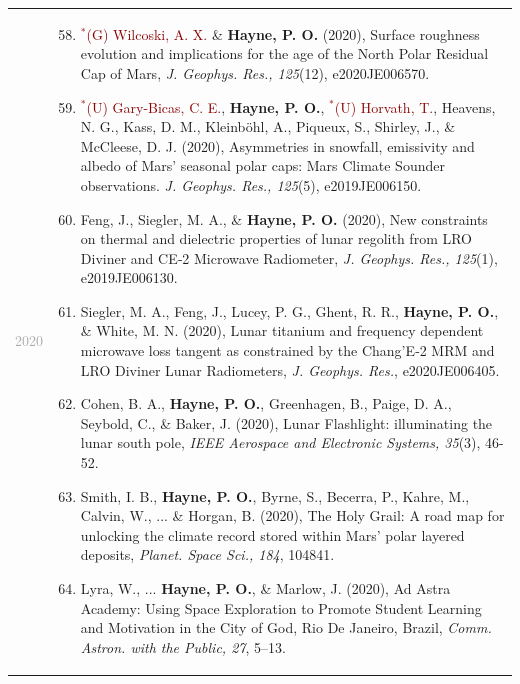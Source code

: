 \documentclass[letterpaper,10pt,twoside]{article}
\begin{document}
\noindent\begin{longtable}{@{} p{} p{}}
        \noindent\textcolor{darkgray}{2020} & \begin{enumerate}[leftmargin=!,labelindent=2.5pt,itemindent=-10pt]\setcounter{enumi}{57}
             \item {\small \textcolor{darkred}{$^*$(G) Wilcoski, A. X.} \& \textbf{Hayne, P. O.} (2020), Surface roughness evolution and implications for the age of the North Polar Residual Cap of Mars, \textit{J. Geophys. Res., 125}(12), e2020JE006570. 
             }   
             \item{\small \textcolor{darkred}{$^*$(U) Gary-Bicas, C. E.}, \textbf{Hayne, P. O.}, \textcolor{darkred}{$^*$(U) Horvath, T.}, Heavens, N. G., Kass, D. M., Kleinb\"{o}hl, A., Piqueux, S., Shirley, J., \& McCleese, D. J. (2020), Asymmetries in snowfall, emissivity and albedo of Mars' seasonal polar caps: Mars Climate Sounder observations. {\it J. Geophys. Res., 125}(5), e2019JE006150.
             }
             \item{\small Feng, J., Siegler, M. A., \& \textbf{Hayne, P. O.} (2020), New constraints on thermal and dielectric properties of lunar regolith from LRO Diviner and CE‐2 Microwave Radiometer, \textit{J. Geophys. Res., 125}(1), e2019JE006130.
             }
             \item{\small Siegler, M. A., Feng, J., Lucey, P. G., Ghent, R. R., \textbf{Hayne, P. O.}, \& White, M. N. (2020), Lunar titanium and frequency dependent microwave loss tangent as constrained by the Chang’E‐2 MRM and LRO Diviner Lunar Radiometers, \textit{J. Geophys. Res.}, e2020JE006405.
             }
             \item{\small Cohen, B. A., \textbf{Hayne, P. O.}, Greenhagen, B., Paige, D. A., Seybold, C., \& Baker, J. (2020), Lunar Flashlight: illuminating the lunar south pole, {\it IEEE Aerospace and Electronic Systems, 35}(3), 46-52.
             }
             \item{\small Smith, I. B., \textbf{Hayne, P. O.}, Byrne, S., Becerra, P., Kahre, M., Calvin, W., ... \& Horgan, B. (2020), The Holy Grail: A road map for unlocking the climate record stored within Mars’ polar layered deposits, {\it Planet. Space Sci., 184}, 104841.
             }
             \item{\small Lyra, W., ... \textbf{Hayne, P. O.}, \& Marlow, J. (2020), Ad Astra Academy: Using Space Exploration to Promote Student Learning and Motivation in the City of God, Rio De Janeiro, Brazil, \textit{Comm. Astron. with the Public, 27}, 5--13.
}
\end{enumerate}
\end{longtable}
\end{document}
